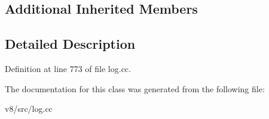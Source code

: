 \subsection*{Additional Inherited Members}


\subsection{Detailed Description}


Definition at line 773 of file log.\+cc.



The documentation for this class was generated from the following file\+:\begin{DoxyCompactItemize}
\item 
v8/src/log.\+cc\end{DoxyCompactItemize}
